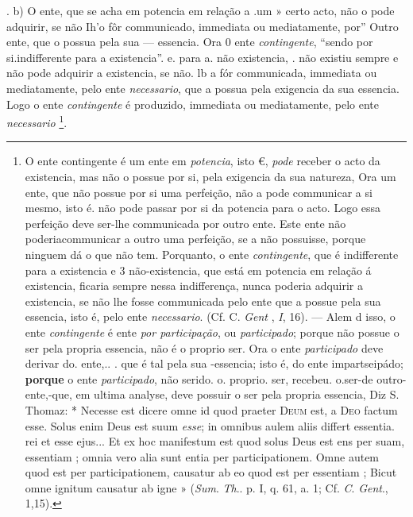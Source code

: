 . b) O ente, que se acha em potencia em relação a .um » certo acto, não o pode adquirir, se não Ih'o fôr communicado, immediata ou mediatamente, por” Outro ente, que o possua pela sua --- essencia. Ora 0 ente \emph{contingente}, “sendo por si.indifferente para a existencia”. e. para a. não existencia, . não existiu sempre e não pode adquirir a existencia, se não. lb a fór communicada, immediata ou mediatamente, pelo ente \emph{necessario}, que a possua pela exigencia da sua essencia. Logo o ente \emph{contingente} é produzido, immediata ou mediatamente, pelo ente \emph{necessario} \footnote{O ente contingente é um ente em \emph{potencia}, isto €, \emph{pode} receber o acto da existencia, mas não o possue por si, pela exigencia da sua natureza, Ora um ente, que não possue por si uma perfeição, não a pode communicar a si mesmo, isto é. não pode passar por si da potencia para o acto. Logo essa perfeição deve ser-lhe communicada por outro ente. Este ente não poderiacommunicar a outro uma perfeição, se a não possuisse, porque ninguem dá o que não tem. Porquanto, o ente \emph{contingente}, que é indifferente para a existencia e 3 não-existencia, que está em potencia em relação á existencia, ficaria sempre nessa indifferença, nunca poderia adquirir a existencia, se não lhe fosse communicada pelo ente que a possue pela sua essencia, isto é, pelo ente \emph{necessario}. (Cf. C. \emph{Gent} , \emph{I}, 16). --- Alem d isso, o ente \emph{contingente} é ente \emph{por participação}, ou \emph{participado}; porque não possue o ser pela propria essencia, não é o proprio ser. Ora o ente \emph{participado} deve derivar do. ente,.. . que é tal pela sua -essencia; isto é, do ente impartseipádo; \textbf{porque} o ente \emph{participado}, não serido. o. proprio. ser, recebeu. o.ser-de outro- ente,-que, em ultima analyse, deve possuir o ser pela propria essencia, Diz S. Thomaz: * Necesse est dicere omne id quod praeter \textsc{Deum} est, a \textsc{Deo} factum esse. Solus enim Deus est suum \emph{esse}; in omnibus aulem aliis differt essentia. rei et esse ejus... Et ex hoc manifestum est quod solus Deus est ens per suam, essentiam ; omnia vero alia sunt entia per participationem. Omne autem quod est per participationem, causatur ab eo quod est per essentiam ; Bicut omne ignitum causatur ab igne » (\emph{Sum}. \emph{Th}.. p. I, q. 61, a. 1; Cf. \emph{C}. \emph{Gent}., 1,15).}.

